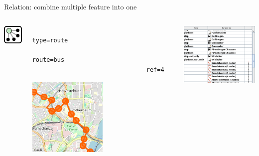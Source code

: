 \documentclass{beamer}
\begin{document}
			\begin{frame}[fragile]{Relation: combine multiple feature into one}
				\begin{center}
					\begin{columns}
						\begin{column}{1.25cm}
							\centering
							\includegraphics[width=1cm]{images/240px-Mf_relation.png}
						\end{column}
						\begin{column}{4cm}
							\begin{verbatim}
								type=route
								route=bus
								ref=4
							\end{verbatim}
							\vspace{0.25cm}
							\includegraphics[width=3.75cm]{images/relation-example.png}
						\end{column}
						\begin{column}{4cm}
							\includegraphics[width=4cm]{images/relation-list.png}
						\end{column}
					\end{columns}
				\end{center}
			\end{frame}
			
\end{document}
